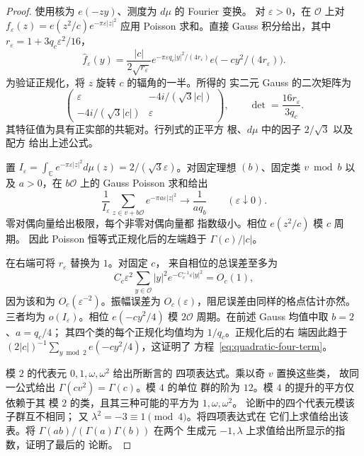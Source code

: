 \begin{proof}
使用核为 $e(-zy)$、测度为 $d\mu$ 的 Fourier 变换。
对 $\varepsilon>0$，在 $\mathcal O$ 上对
$f_\varepsilon(z)=e(z^2/c)e^{-\pi\varepsilon|z|^2}$ 应用 Poisson 求和。直接 Gauss
积分给出，其中 $r_\varepsilon=1+3q_c\varepsilon^2/16$，
\[
 \widehat f_\varepsilon(y)
 =\frac{|c|}{2\sqrt{r_\varepsilon}}
    e^{-\pi\varepsilon q_c|y|^2/(4r_\varepsilon)}
    e\bigl(-cy^2/(4r_\varepsilon)\bigr).
\]
为验证正规化，将 $z$ 旋转 $c$ 的辐角的一半。所得的
实二元 Gauss 的二次矩阵为
\[
 \begin{pmatrix}
 \varepsilon&-4i/(\sqrt3|c|)\\
 -4i/(\sqrt3|c|)&\varepsilon
 \end{pmatrix},
 \qquad \det=\frac{16r_\varepsilon}{3q_c}.
\]
其特征值为具有正实部的共轭对。行列式的正平方
根、$d\mu$ 中的因子 $2/\sqrt3$ 以及配方
给出上述公式。

置 $I_\varepsilon=\int_{\mathbb C}e^{-\pi\varepsilon|z|^2}d\mu(z)
=2/(\sqrt3\varepsilon)$。对固定理想 $(b)$、固定类 $v\bmod b$
以及 $a>0$，在 $b\mathcal O$ 上的 Gauss Poisson 求和给出
\[
 \frac1{I_\varepsilon}\sum_{z\in v+b\mathcal O}
             e^{-\pi a\varepsilon|z|^2}
 \longrightarrow\frac1{a q_b}\qquad(\varepsilon\downarrow0).
\]
零对偶向量给出极限，每个非零对偶向量都
指数级小。相位 $e(z^2/c)$ 模 $c$ 周期。
因此 Poisson 恒等式正规化后的左端趋于
$\Gamma(c)/|c|$。

在右端可将 $r_\varepsilon$ 替换为 $1$。对固定 $c$，
来自相位的总误差至多为
\[
 C_c\varepsilon^2\sum_{y\in\mathcal O}|y|^2
                         e^{-C_c^{-1}\varepsilon|y|^2}=O_c(1),
\]
因为该和为 $O_c(\varepsilon^{-2})$。振幅误差为
$O_c(\varepsilon)$，阻尼误差由同样的格点估计亦然。
三者均为 $o(I_\varepsilon)$。相位 $e(-cy^2/4)$ 模
$2\mathcal O$ 周期。在前述 Gauss 均值中取 $b=2$、$a=q_c/4$；
其四个类的每个正规化均值均为 $1/q_c$。正规化后的右
端因此趋于 $(2|c|)^{-1}\sum_{y\bmod2}e(-cy^2/4)$，这证明了
方程~\eqref{eq:quadratic-four-term}。

模 $2$ 的代表元 $0,1,\omega,\omega^2$ 给出所断言的
四项表达式。乘以奇 $v$ 置换这些类，
故同一公式给出 $\Gamma(cv^2)=\Gamma(c)$。模 $4$ 的单位
群的阶为 $12$。模 $4$ 的提升的平方仅依赖于其
模 $2$ 的类，且其三种可能的平方为 $1,\omega,\omega^2$。
论断中的四个代表元模该子群互不相同；
又 $\lambda^2=-3\equiv1\pmod4$。将四项表达式在
它们上求值给出该表。将 $\Gamma(ab)/(\Gamma(a)\Gamma(b))$ 在两个
生成元 $-1,\lambda$ 上求值给出所显示的指数，证明了最后的
论断。
\end{proof}

